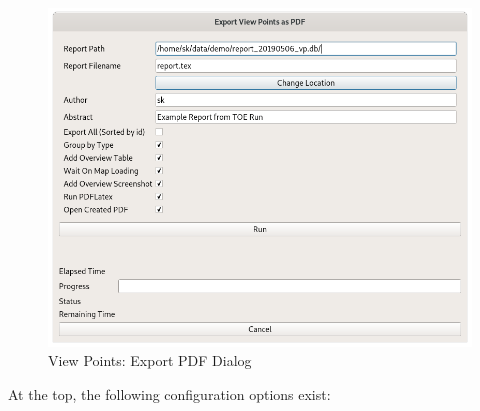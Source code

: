 \begin{figure}[H]
  \centering 
    \includegraphics[width=14cm]{figures/view_points_export_pdf.png}
  \caption{View Points: Export PDF Dialog}
\end{figure}

At the top, the following configuration options exist:

